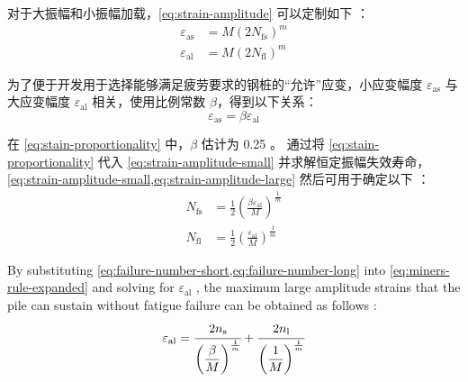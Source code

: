 对于大振幅和小振幅加载，\cref{eq:strain-amplitude} 可以定制如下 \cite{dicleli2004e}：
\begin{align}
  \label{eq:strain-amplitude-small}
  \varepsilon_\text{as} &=   M \left( 2N_\text{fs} \right)^m \\
  \label{eq:strain-amplitude-large}
  \varepsilon_\text{al} &=   M \left( 2N_\text{fl} \right)^m 
\end{align}

为了便于开发用于选择能够满足疲劳要求的钢桩的“允许”应变，小应变幅度 $\varepsilon_\text{as}$ 与大应变幅度 $\varepsilon_\text{al}$ 相关，使用比例常数 $\beta$，得到以下关系：
\begin{equation}
  \label{eq:stain-proportionality}
  \varepsilon_\text{as} = \beta \varepsilon_\text{al}
\end{equation}

在 \cref{eq:stain-proportionality} 中，$\beta$ 估计为 0.25 \cite{karalar2010d}。 通过将 \cref{eq:stain-proportionality} 代入 \cref{eq:strain-amplitude-small} 并求解恒定振幅失效寿命，\cref{eq:strain-amplitude-small,eq:strain-amplitude-large} 然后可用于确定以下 \cite{dicleli2004e}：
\begin{align}
  \label{eq:failure-number-short}
  N_\text{fs} &= \frac12 \left( \frac{\beta \varepsilon_\text{al}}{M}\right)^{\frac{1}{m}} \\
  \label{eq:failure-number-long}
  N_\text{fl} &= \frac12 \left( \frac{\varepsilon_\text{al}}{M}\right)^{\frac{1}{m}}
\end{align}

By substituting \cref{eq:failure-number-short,eq:failure-number-long} into \cref{eq:miners-rule-expanded} and solving for $\varepsilon_\text{al}$ , the maximum large amplitude strains that the pile can sustain without fatigue failure can be obtained as follows \cite{dicleli2004e}:
\begin{equation}
  \label{eq:strain-short-solved}
  \varepsilon_\text{al} =  \cfrac{2n_\text{s}}{\left( \dfrac{\beta}{M}\right)^{\frac{1}{m}}}+\cfrac{2n_\text{l}}{\left( \dfrac{1}{M}\right)^{\frac{1}{m}}} 
\end{equation}


